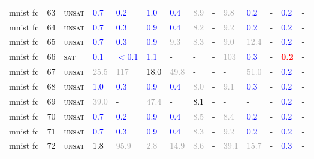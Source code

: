 \begin{center}
{\begin{longtable}{@{}llllllllllllll@{}}
mnist fc & 63 & \textsc{unsat} & \textcolor{blue}{0.7} & \textcolor{blue}{0.2} & \textcolor{blue}{1.0} & \textcolor{blue}{0.4} & \textcolor{darkgray}{8.9} & - & \textcolor{darkgray}{9.8} & \textcolor{blue}{0.2} & - & \textcolor{blue}{0.2} & - \\
mnist fc & 64 & \textsc{unsat} & \textcolor{blue}{0.7} & \textcolor{blue}{0.3} & \textcolor{blue}{0.9} & \textcolor{blue}{0.4} & \textcolor{darkgray}{8.2} & - & \textcolor{darkgray}{9.2} & \textcolor{blue}{0.2} & - & \textcolor{blue}{0.2} & - \\
mnist fc & 65 & \textsc{unsat} & \textcolor{blue}{0.7} & \textcolor{blue}{0.3} & \textcolor{blue}{0.9} & \textcolor{darkgray}{9.3} & \textcolor{darkgray}{8.3} & - & \textcolor{darkgray}{9.0} & \textcolor{darkgray}{12.4} & - & \textcolor{blue}{0.2} & - \\
mnist fc & 66 & \textsc{sat} & \textcolor{blue}{0.1} & \textcolor{blue}{$<$0.1} & \textcolor{blue}{1.1} & - & - & - & \textcolor{darkgray}{103} & \textcolor{blue}{0.3} & - & \textbf{\textcolor{red}{0.2}} & - \\
mnist fc & 67 & \textsc{unsat} & \textcolor{darkgray}{25.5} & \textcolor{darkgray}{117} & \textcolor{black}{18.0} & \textcolor{darkgray}{49.8} & - & - & - & \textcolor{darkgray}{51.0} & - & \textcolor{blue}{0.2} & - \\
mnist fc & 68 & \textsc{unsat} & \textcolor{blue}{1.0} & \textcolor{blue}{0.3} & \textcolor{blue}{0.9} & \textcolor{blue}{0.4} & \textcolor{darkgray}{8.0} & - & \textcolor{darkgray}{9.1} & \textcolor{blue}{0.3} & - & \textcolor{blue}{0.2} & - \\
mnist fc & 69 & \textsc{unsat} & \textcolor{darkgray}{39.0} & - & \textcolor{darkgray}{47.4} & - & \textcolor{black}{8.1} & - & - & - & - & \textcolor{blue}{0.2} & - \\
mnist fc & 70 & \textsc{unsat} & \textcolor{blue}{0.7} & \textcolor{blue}{0.2} & \textcolor{blue}{0.9} & \textcolor{blue}{0.4} & \textcolor{darkgray}{8.5} & - & \textcolor{darkgray}{8.4} & \textcolor{blue}{0.2} & - & \textcolor{blue}{0.2} & - \\
mnist fc & 71 & \textsc{unsat} & \textcolor{blue}{0.7} & \textcolor{blue}{0.3} & \textcolor{blue}{0.9} & \textcolor{blue}{0.4} & \textcolor{darkgray}{8.3} & - & \textcolor{darkgray}{9.2} & \textcolor{blue}{0.2} & - & \textcolor{blue}{0.2} & - \\
mnist fc & 72 & \textsc{unsat} & \textcolor{black}{1.8} & \textcolor{darkgray}{95.9} & \textcolor{darkgray}{2.8} & \textcolor{darkgray}{14.9} & \textcolor{darkgray}{8.6} & - & \textcolor{darkgray}{39.1} & \textcolor{darkgray}{15.7} & - & \textcolor{blue}{0.3} & - \\

\end{longtable}}
\end{center}
